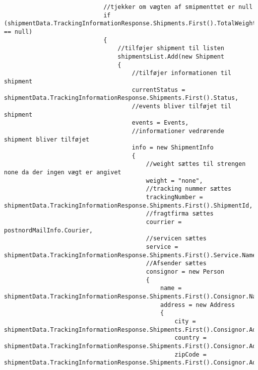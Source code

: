 \begin{verbatim}
                            //tjekker om vægten af smipmenttet er null
                            if (shipmentData.TrackingInformationResponse.Shipments.First().TotalWeight == null)
                            {
                                //tilføjer shipment til listen
                                shipmentsList.Add(new Shipment
                                {
                                    //tilføjer informationen til shipment
                                    currentStatus = shipmentData.TrackingInformationResponse.Shipments.First().Status,
                                    //events bliver tilføjet til shipment
                                    events = Events,
                                    //informationer vedrørende shipment bliver tilføjet
                                    info = new ShipmentInfo
                                    {
                                        //weight sættes til strengen none da der ingen vægt er angivet
                                        weight = "none",
                                        //tracking nummer sættes
                                        trackingNumber = shipmentData.TrackingInformationResponse.Shipments.First().ShipmentId,
                                        //fragtfirma sættes
                                        courrier = postnordMailInfo.Courier,
                                        //servicen sættes
                                        service = shipmentData.TrackingInformationResponse.Shipments.First().Service.Name,
                                        //Afsender sættes
                                        consignor = new Person
                                        {
                                            name = shipmentData.TrackingInformationResponse.Shipments.First().Consignor.Name,
                                            address = new Address
                                            {
                                                city = shipmentData.TrackingInformationResponse.Shipments.First().Consignor.Address.City,
                                                country = shipmentData.TrackingInformationResponse.Shipments.First().Consignor.Address.Country,
                                                zipCode = shipmentData.TrackingInformationResponse.Shipments.First().Consignor.Address.PostCode.ToString(),
        

\end{verbatim}
